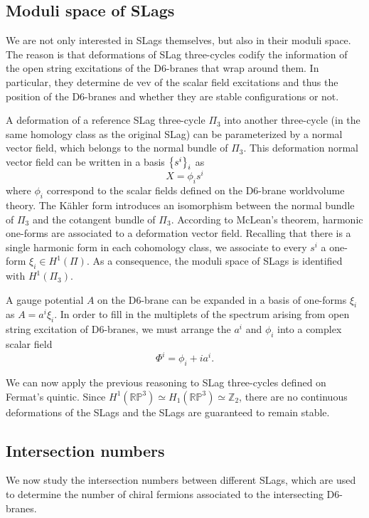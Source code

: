 \subsection{Moduli space of SLags}

We are not only interested in SLags themselves, but also in their moduli space.
The reason is that deformations of SLag three-cycles codify the information of the open string 
excitations of the D$6$-branes that wrap around them.
In particular, they determine de vev of the scalar field excitations and thus the position of the D6-branes
and whether they are stable configurations or not.

A deformation of a reference SLag three-cycle $\Pi_3$ into another three-cycle (in the same homology class as the original SLag)  can be parameterized by a normal vector field, which belongs to the normal bundle of $\Pi_3$.  
This deformation normal vector field can be written in a basis $\qty{s^i}_i$ as
\begin{equation}
  X=\phi_i s^i
\end{equation}
where $\phi_i$ correspond to the scalar fields defined on the D6-brane worldvolume theory.
The Kähler form introduces an isomorphism between the normal bundle of $\Pi_3$ and the cotangent bundle of $\Pi_3$.
According to McLean's theorem, harmonic one-forms are associated to a deformation vector field.
Recalling that there is a single harmonic form in each cohomology class, we associate to every $s^i$ a one-form $\xi_i\in H^1(\Pi)$.
As a consequence, the moduli space of SLags is identified with $H^1(\Pi_3)$.

A gauge potential $A$ on the D$6$-brane can be expanded in a basis of one-forms $\xi_i$ as $A=a^i \xi_i$.
In order to fill in the multiplets of the spectrum arising from open string excitation of D6-branes,
we must arrange the $a^i$ and $\phi_i$ into a complex scalar field
\begin{equation}
 \Phi^i = \phi_i + ia^i. 
\end{equation}

We can now apply the previous reasoning to SLag three-cycles defined on Fermat's quintic.
Since $H^1(\mathbb{RP}^3)\simeq H_1(\mathbb{RP}^3)\simeq\mathbb Z_2$, there are no continuous deformations of the
SLags and the SLags are guaranteed to remain stable.

\subsection{Intersection numbers}
We now study the intersection numbers between different SLags, which are used to determine the number 
of chiral fermions associated to the intersecting D6-branes.

